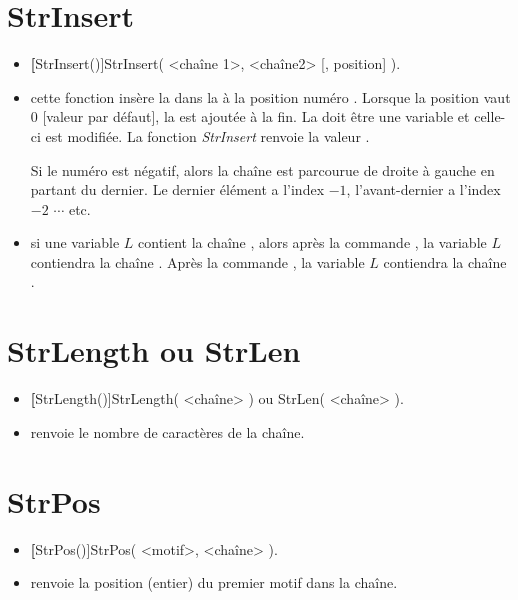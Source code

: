 \section{StrInsert}\label{cmdStrInsert}

\begin{itemize}
 \item \util \textbf[StrInsert()]{StrInsert( <chaîne 1>, <chaîne2> [, position] )}.
 \item \desc cette fonction insère la  dans la  à la position numéro . Lorsque la position vaut 0 [valeur par défaut], la  est ajoutée à la fin. La  doit être une variable et celle-ci est modifiée. La fonction \textsl{StrInsert} renvoie la valeur \Nil.
 
  Si le numéro  est négatif, alors la chaîne est parcourue de droite à gauche en partant du dernier. Le dernier élément a l'index $-1$, l'avant-dernier a l'index $-2$ $\cdots$ etc.
  
 \item \exem si une variable $L$ contient la chaîne , alors après la commande , la variable $L$ contiendra la chaîne . Après la commande , la variable $L$ contiendra la chaîne .
\end{itemize}


\section{StrLength ou StrLen}\label{cmdStrLength}

\begin{itemize}
 \item \util \textbf[StrLength()]{StrLength( <chaîne> ) ou StrLen( <chaîne> )}.
 \item \desc renvoie le nombre de caractères de la chaîne.
\end{itemize}


\section{StrPos}\label{cmdStrPos}

\begin{itemize}
 \item \util \textbf[StrPos()]{StrPos( <motif>, <chaîne> )}.
 \item \desc renvoie la position (entier) du premier motif dans la chaîne.
\end{itemize}

